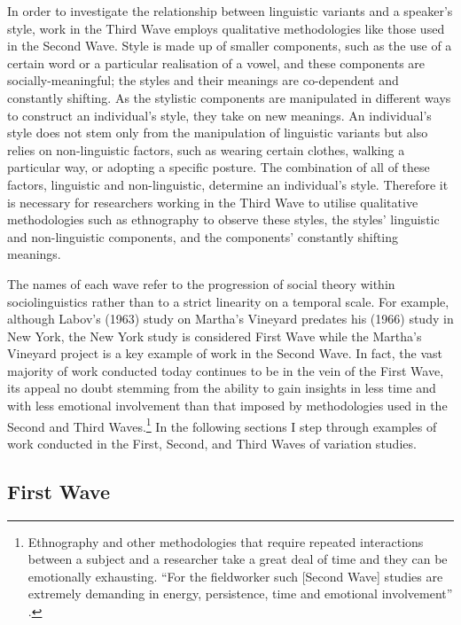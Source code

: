 In order to investigate the relationship between linguistic variants and a speaker's style, work in the Third Wave employs qualitative methodologies like those used in the Second Wave.  Style is made up of smaller components, such as the use of a certain word or a particular realisation of a vowel, and these components are socially-meaningful; the styles and their meanings are co-dependent and constantly shifting.  As the stylistic components are manipulated in different ways to construct an individual's style, they take on new meanings.  An individual's style does not stem only from the manipulation of linguistic variants but also relies on non-linguistic factors, such as wearing certain clothes, walking a particular way, or adopting a specific posture.  The combination of all of these factors, linguistic and non-linguistic, determine an individual's style.  Therefore it is necessary for researchers working in the Third Wave to utilise qualitative methodologies such as ethnography to observe these styles, the styles' linguistic and non-linguistic components, and the components' constantly shifting meanings.

The names of each wave refer to the progression of social theory within sociolinguistics rather than to a strict linearity on a temporal scale.  For example, although Labov's (1963) study on Martha's Vineyard predates his (1966) study in New York, the New York study is considered First Wave while the Martha's Vineyard project is a key example of work in the Second Wave.  In fact, the vast majority of work conducted today continues to be in the vein of the First Wave, its appeal no doubt stemming from the ability to gain insights in less time and with less emotional involvement than that imposed by methodologies used in the Second and Third Waves.\footnote{Ethnography and other methodologies that require repeated interactions between a subject and a researcher take a great deal of time and they can be emotionally exhausting.  ``For the fieldworker such [Second Wave] studies are extremely demanding in energy, persistence, time and emotional involvement'' \cite[79]{milroy1987}.}	 In the following sections I step through  examples of work conducted in the First, Second, and Third Waves of variation studies.

\subsection{First Wave}

